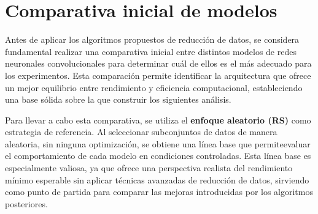 \section{Comparativa inicial de modelos}\label{sec:comparativa-inicial-modelos}
Antes de aplicar los algoritmos propuestos de reducción de datos, se considera fundamental realizar una comparativa inicial entre distintos
modelos de redes neuronales convolucionales para determinar cuál de ellos es el más adecuado para los experimentos.
Esta comparación permite identificar la arquitectura que ofrece un mejor equilibrio entre rendimiento y eficiencia computacional,
estableciendo una base sólida sobre la que construir los siguientes análisis.

Para llevar a cabo esta comparativa, se utiliza el \textbf{enfoque aleatorio (RS)} como estrategia de referencia.
Al seleccionar subconjuntos de datos de manera aleatoria, sin ninguna optimización, se obtiene una línea base que permiteevaluar el
comportamiento de cada modelo en condiciones controladas.
Esta línea base es especialmente valiosa, ya que ofrece una perspectiva realista del rendimiento mínimo esperable sin aplicar técnicas
avanzadas de reducción de datos, sirviendo como punto de partida para comparar las mejoras introducidas por los algoritmos posteriores.


